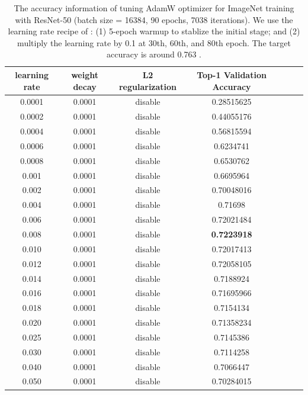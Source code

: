 \begin{table}[ht]
\renewcommand{\arraystretch}{1.3}
\caption{The accuracy information of tuning AdamW optimizer for ImageNet training with ResNet-50 (batch size = 16384, 90 epochs, 7038 iterations). We use the learning rate recipe of \citep{goyal2017accurate}: (1) 5-epoch warmup to stablize the initial stage; and (2) multiply the learning rate by 0.1 at 30th, 60th, and 80th epoch. The target accuracy is around 0.763 \citep{goyal2017accurate}.}
\centering
\begin{tabular}{|c|c|c|c|c|c|c|}
\hline
learning rate & weight decay & L2 regularization & Top-1 Validation Accuracy \\
\hline
\hline
0.0001 & 0.0001 & disable & 0.28515625 \\
\hline
0.0002 & 0.0001 & disable & 0.44055176 \\
\hline
0.0004 & 0.0001 & disable & 0.56815594 \\
\hline
0.0006 & 0.0001 & disable & 0.6234741 \\
\hline
0.0008 & 0.0001 & disable & 0.6530762 \\
\hline
0.001 & 0.0001 & disable & 0.6695964 \\
\hline
0.002 & 0.0001 & disable & 0.70048016 \\
\hline
0.004 & 0.0001 & disable & 0.71698 \\
\hline
0.006 & 0.0001 & disable & 0.72021484 \\
\hline
0.008 & 0.0001 & disable & {\bf 0.7223918} \\
\hline
0.010 & 0.0001 & disable &  0.72017413\\
\hline
0.012 & 0.0001 & disable &  0.72058105\\
\hline
0.014 & 0.0001 & disable &  0.7188924\\
\hline
0.016 & 0.0001 & disable &  0.71695966\\
\hline
0.018 & 0.0001 & disable &  0.7154134\\
\hline
0.020 & 0.0001 & disable &  0.71358234\\
\hline
0.025 & 0.0001 & disable &  0.7145386\\
\hline
0.030 & 0.0001 & disable &  0.7114258\\
\hline
0.040 & 0.0001 & disable &  0.7066447\\
\hline
0.050 & 0.0001 & disable &  0.70284015\\
\hline
\end{tabular}
\label{table:imagenet_adam_tuning_nol2_2}
\end{table}


